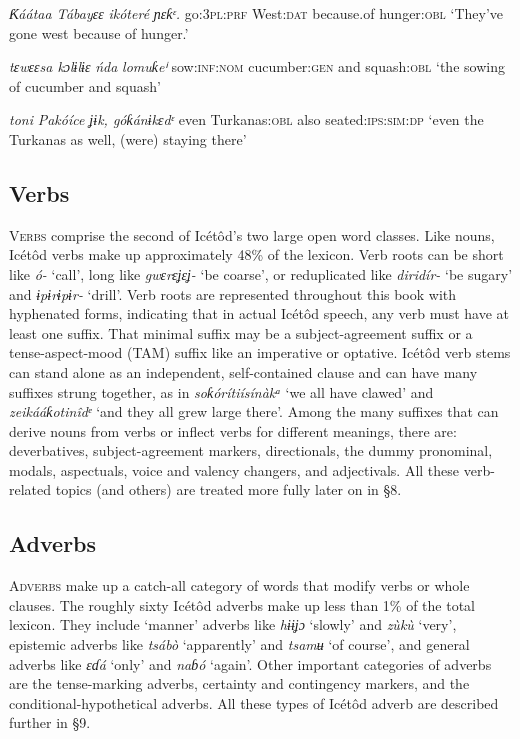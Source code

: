 \textit{Ƙáátaa   Tábayɛɛ}   \textit{ikóteré}\textit{   ɲɛƙᵋ.}
go:\textsc{3pl:prf}   West:\textsc{dat}   because.of   hunger:\textsc{obl}
‘They’ve gone west because of hunger.’




\textit{tɛwɛɛsa     kɔlɨlɨɛ}       \textit{ńda}\textit{   lomuƙeⁱ}
sow:\textsc{inf:nom}   cucumber:\textsc{gen}   and   squash:\textsc{obl}
‘the sowing of cucumber and squash’




\textit{toni}\textit{   Pakóíce     ʝɨk,   góƙánɨkɛdᵋ}
even  Turkanas:\textsc{obl}   also   seated:\textsc{ips:sim:dp}
‘even the Turkanas as well, (were) staying there’






\subsection{Verbs}


\textsc{Verbs} comprise the second of Icétôd’s two large open word classes. Like nouns, Icétôd verbs make up approximately 48\% of the lexicon. Verb roots can be short like \textit{ó-} ‘call’, long like \textit{gwɛrɛʝɛʝ-} ‘be coarse’, or reduplicated like \textit{diridír-} ‘be sugary’ and \textit{ɨpɨrɨpɨr-} ‘drill’. Verb roots are represented throughout this book with hyphenated forms, indicating that in actual Icétôd speech, any verb must have at least one suffix. That minimal suffix may be a subject-agreement suffix or a tense-aspect-mood (TAM) suffix like an imperative or optative. Icétôd verb stems can stand alone as an independent, self-contained clause and can have many suffixes strung together, as in \textit{soƙórítiísínàkᵃ} ‘we all have clawed’ and \textit{zeikááƙotinîdᵉ} ‘and they all grew large there’. Among the many suffixes that can derive nouns from verbs or inflect verbs for different meanings, there are: deverbatives, subject-agreement markers, directionals, the dummy pronominal, modals, aspectuals, voice and valency changers, and adjectivals. All these verb-related topics (and others) are treated more fully later on in §8.




\subsection{Adverbs}


\textsc{Adverbs} make up a catch-all category of words that modify verbs or whole clauses. The roughly sixty Icétôd adverbs make up less than 1\% of the total lexicon. They include ‘manner’ adverbs like \textit{hɨɨʝɔ} ‘slowly’ and \textit{zùkù} ‘very’, epistemic adverbs like \textit{tsábò} ‘apparently’ and \textit{tsamʉ} ‘of course’, and general adverbs like \textit{ɛɗá} ‘only’ and \textit{naɓó} ‘again’. Other important categories of adverbs are the tense-marking adverbs, certainty and contingency markers, and the conditional-hypothetical adverbs. All these types of Icétôd adverb are described further in §9.




